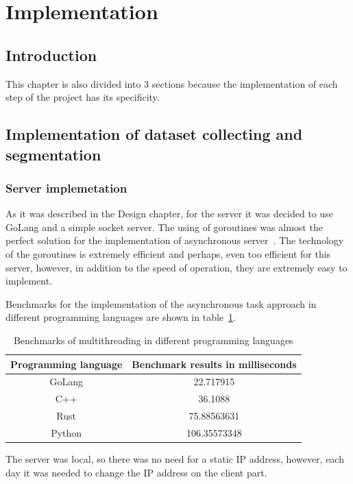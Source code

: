 \section{Implementation}
\subsection{Introduction}
This chapter is also divided into 3 sections because the implementation of each step of the project has its specificity.
\subsection{Implementation of dataset collecting and segmentation}
\subsubsection{Server implemetation}
As it was described in the Design chapter, for the server it was decided to use GoLang and a simple socket server. 
The using of goroutines was almost the perfect solution for the implementation of asynchronous server~\cite{goroutines}\cite{go_shedulers}.
The technology of the goroutines is extremely efficient and perhaps, even too efficient for this server, however, in addition to the speed 
of operation, they are extremely easy to implement.

Benchmarks for the implementation of the asynchronous task approach in different programming languages are shown in table~\ref{tab:multithreading_benchmarks}.

\begin{table}[h]
    \centering 
    \begin{tabular}{|c|c|}
        \hline
        Programming language & Benchmark results in milliseconds\\ \hline
        GoLang & 22.717915 \\ \hline
        C++ & 36.1088 \\ \hline
        Rust & 75.88563631 \\  \hline
        Python & 106.35573348 \\ \hline
    \end{tabular}
    \caption{Benchmarks of multithreading in different programming languages}\label{tab:multithreading_benchmarks}
\end{table}

The server was local, so there was no need for a static IP address, however, each day it was needed to change the IP address on the client part.
